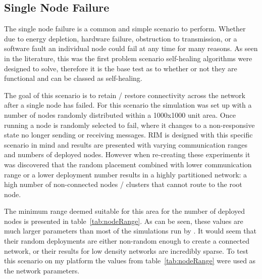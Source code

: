 \documentclass[authoryearcitations]{UoYCSproject}
\begin{document}
\subsection{Single Node Failure}

The single node failure is a common and simple scenario to perform. Whether due to energy depletion, hardware failure, obstruction to transmission, or a software fault an individual node could fail at any time for many reasons. As seen in the literature, this was the first problem scenario self-healing algorithms were designed to solve, therefore it is the base test as to whether or not they are functional and can be classed as self-healing.

The goal of this scenario is to retain / restore connectivity across the network after a single node has failed. For this scenario the simulation was set up with a number of nodes randomly distributed within a 1000x1000 unit area. Once running a node is randomly selected to fail, where it changes to a non-responsive state no longer sending or receiving messages. RIM is designed with this specific scenario in mind and results are presented with varying communication ranges and numbers of deployed nodes. However when re-creating these experiments it was discovered that the random placement combined with lower communication range or a lower deployment number results in a highly partitioned network: a high number of non-connected nodes / clusters that cannot route to the root node.

\begin{table}[]
\centering
{}
\caption{Minimum ranges for number of randomly deployed nodes in a 1000x1000 unit area.}
\label{tab:nodeRange}
\end{table}

The minimum range deemed suitable for this area for the number of deployed nodes is presented in table~\ref{tab:nodeRange}. As can be seen, these values are much larger parameters than most of the simulations run by \citeauthor*{Younis2010}. It would seem that their random deployments are either non-random enough to create a connected network, or their results for low density networks are incredibly sparse. To test this scenario on my platform the values from table~\ref{tab:nodeRange} were used as the network parameters.
\end{document}
